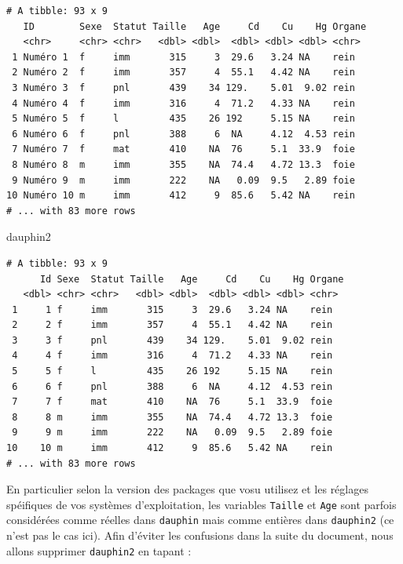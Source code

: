 \documentclass[a4paperpaper,]{article}
\newenvironment{Shaded}{\begin{snugshade}}{\end{snugshade}}
\newcommand{\NormalTok}[1]{\textcolor[rgb]{0.12,0.11,0.11}{#1}}
\begin{document}
\begin{verbatim}
# A tibble: 93 x 9
   ID        Sexe  Statut Taille   Age     Cd    Cu    Hg Organe
   <chr>     <chr> <chr>   <dbl> <dbl>  <dbl> <dbl> <dbl> <chr> 
 1 Numéro 1  f     imm       315     3  29.6   3.24 NA    rein  
 2 Numéro 2  f     imm       357     4  55.1   4.42 NA    rein  
 3 Numéro 3  f     pnl       439    34 129.    5.01  9.02 rein  
 4 Numéro 4  f     imm       316     4  71.2   4.33 NA    rein  
 5 Numéro 5  f     l         435    26 192     5.15 NA    rein  
 6 Numéro 6  f     pnl       388     6  NA     4.12  4.53 rein  
 7 Numéro 7  f     mat       410    NA  76     5.1  33.9  foie  
 8 Numéro 8  m     imm       355    NA  74.4   4.72 13.3  foie  
 9 Numéro 9  m     imm       222    NA   0.09  9.5   2.89 foie  
10 Numéro 10 m     imm       412     9  85.6   5.42 NA    rein  
# ... with 83 more rows
\end{verbatim}

\begin{Shaded}
\begin{Highlighting}[]
\NormalTok{dauphin2}
\end{Highlighting}
\end{Shaded}

\begin{verbatim}
# A tibble: 93 x 9
      Id Sexe  Statut Taille   Age     Cd    Cu    Hg Organe
   <dbl> <chr> <chr>   <dbl> <dbl>  <dbl> <dbl> <dbl> <chr> 
 1     1 f     imm       315     3  29.6   3.24 NA    rein  
 2     2 f     imm       357     4  55.1   4.42 NA    rein  
 3     3 f     pnl       439    34 129.    5.01  9.02 rein  
 4     4 f     imm       316     4  71.2   4.33 NA    rein  
 5     5 f     l         435    26 192     5.15 NA    rein  
 6     6 f     pnl       388     6  NA     4.12  4.53 rein  
 7     7 f     mat       410    NA  76     5.1  33.9  foie  
 8     8 m     imm       355    NA  74.4   4.72 13.3  foie  
 9     9 m     imm       222    NA   0.09  9.5   2.89 foie  
10    10 m     imm       412     9  85.6   5.42 NA    rein  
# ... with 83 more rows
\end{verbatim}

En particulier selon la version des packages que vosu utilisez et les réglages spéifiques de vos systèmes d'exploitation, les variables \texttt{Taille} et \texttt{Age} sont parfois considérées comme réelles dans \texttt{dauphin} mais comme entières dans \texttt{dauphin2} (ce n'est pas le cas ici). Afin d'éviter les confusions dans la suite du document, nous allons supprimer \texttt{dauphin2} en tapant :
\end{document}
